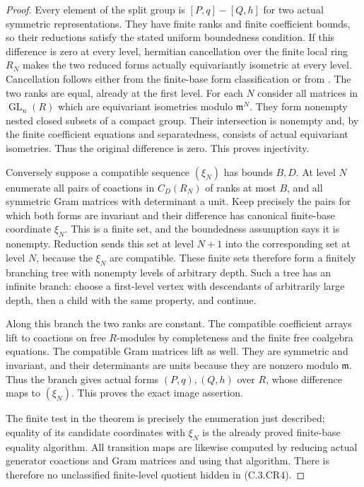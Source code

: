 \begin{proof}
Every element of the split group is $[P,q]-[Q,h]$
for two actual symmetric representations. They
have finite ranks and finite coefficient bounds,
so their reductions satisfy the stated uniform
boundedness condition.
If this difference is zero at every level,
hermitian cancellation over the finite local ring
$R_N$ makes the two reduced forms actually
equivariantly isometric at every level.
Cancellation follows either from the finite-base
form classification or from
\cite[Section 3.4(1), p.\ 273]{C-QSS1979}.
The two ranks are equal, already at the first level.
For each $N$ consider all matrices in
$\operatorname{GL}_n(R)$ which are equivariant
isometries modulo $\mathfrak m^N$.
They form nonempty nested closed subsets of a
compact group. Their intersection is nonempty
and, by the finite coefficient equations and
separatedness, consists of actual equivariant
isometries. Thus the original difference is zero.
This proves injectivity.

Conversely suppose a compatible sequence $(\xi_N)$
has bounds $B,D$. At level $N$ enumerate all pairs
of coactions in $C_D(R_N)$ of ranks at most $B$,
and all symmetric Gram matrices with determinant
a unit. Keep precisely the pairs for which both
forms are invariant and their difference has
canonical finite-base coordinate $\xi_N$.
This is a finite set, and the boundedness assumption
says it is nonempty. Reduction sends this set
at level $N+1$ into the corresponding set at
level $N$, because the $\xi_N$ are compatible.
These finite sets therefore form a finitely
branching tree with nonempty levels of arbitrary
depth. Such a tree has an infinite branch:
choose a first-level vertex with descendants
of arbitrarily large depth, then a child with
the same property, and continue.

Along this branch the two ranks are constant.
The compatible coefficient arrays lift to coactions
on free $R$-modules by completeness and the finite
free coalgebra equations. The compatible Gram
matrices lift as well. They are symmetric and
invariant, and their determinants are units
because they are nonzero modulo $\mathfrak m$.
Thus the branch gives actual forms $(P,q),(Q,h)$
over $R$, whose difference maps to $(\xi_N)$.
This proves the exact image assertion.

The finite test in the theorem is precisely the
enumeration just described; equality of its
candidate coordinates with $\xi_N$ is the already
proved finite-base equality algorithm.
All transition maps are likewise computed by
reducing actual generator coactions and Gram
matrices and using that algorithm.
There is therefore no unclassified finite-level
quotient hidden in (C.3.CR4).


\end{proof}
